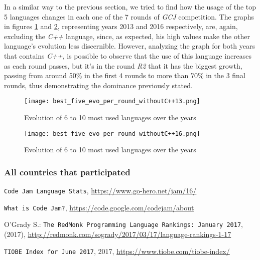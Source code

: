 \documentclass{article}
\begin{document}
\begin{multicols*}{2}
In a similar way to the previous section, we tried to find how the usage of the top 5 languages changes in each one of the 7 rounds of \textit{GCJ} competition.
The graphs in figures \ref{fig:best5_evo_round_13} and \ref{fig:best5_evo_round_16}, representing years 2013 and 2016 respectively, are, again, excluding the \textit{C++} language, since, as expected, his high values make the other language's evolution less discernible.
However, analyzing the graph for both years that contains \textit{C++}, is possible to observe that the use of this language increases as each round passes, but it's in the round \textit{R2} that it has the biggest growth, passing from around 50\% in the first 4 rounds to more than 70\% in the 3 final rounds, thus demonstrating the dominance previously stated.




\begin{figure}[H]
    \centering
    \texttt{[image: best\_five\_evo\_per\_round\_withoutC++13.png]}
    \caption{Evolution of 6 to 10 most used languages over the years}
    \label{fig:best5_evo_round_13}
\end{figure}

\begin{figure}[H]
    \centering
    \texttt{[image: best\_five\_evo\_per\_round\_withoutC++16.png]}
    \caption{Evolution of 6 to 10 most used languages over the years}
    \label{fig:best5_evo_round_16}
\end{figure}


\subsubsection{All countries that participated}




\begin{thebibliography}{1}

\raggedright \texttt{Code Jam Language Stats}, \url{https://www.go-hero.net/jam/16/}

\raggedright \texttt{What is Code Jam?}, \url{https://code.google.com/codejam/about}

\raggedright
O'Grady S.: \texttt{The RedMonk Programming Language Rankings: January 2017}, (2017), \url{http://redmonk.com/sogrady/2017/03/17/language-rankings-1-17}


\raggedright \texttt{TIOBE Index for June 2017}, 2017, \url{https://www.tiobe.com/tiobe-index/}

\end{thebibliography}

\end{multicols*}
\end{document}
